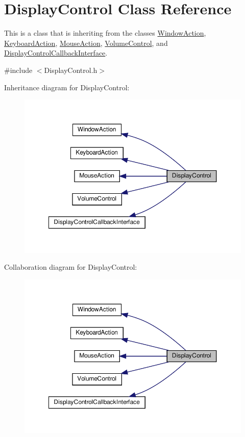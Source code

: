 \hypertarget{classDisplayControl}{}\section{Display\+Control Class Reference}
\label{classDisplayControl}


This is a class that is inheriting from the classes \hyperlink{classWindowAction}{Window\+Action}, \hyperlink{classKeyboardAction}{Keyboard\+Action}, \hyperlink{classMouseAction}{Mouse\+Action}, \hyperlink{classVolumeControl}{Volume\+Control}, and \hyperlink{classDisplayControlCallbackInterface}{Display\+Control\+Callback\+Interface}.  




{\ttfamily \#include $<$Display\+Control.\+h$>$}



Inheritance diagram for Display\+Control\+:\nopagebreak
\begin{figure}[H]
\begin{center}
\leavevmode
\includegraphics[width=350pt]{classDisplayControl__inherit__graph}
\end{center}
\end{figure}


Collaboration diagram for Display\+Control\+:\nopagebreak
\begin{figure}[H]
\begin{center}
\leavevmode
\includegraphics[width=350pt]{classDisplayControl__coll__graph}
\end{center}
\end{figure}
